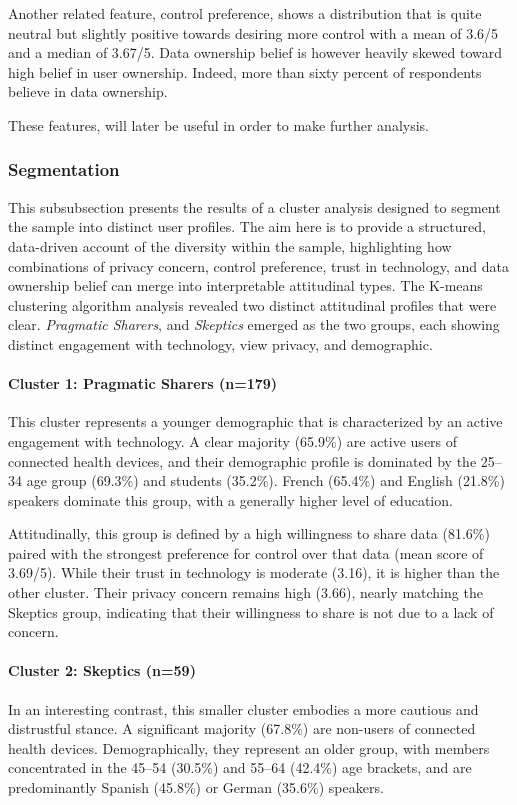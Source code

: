 	Another related feature, control preference, shows a distribution that is quite neutral but slightly positive towards desiring more control with a mean of 3.6/5 and a median of 3.67/5.
	Data ownership belief is however heavily skewed toward high belief in user ownership. Indeed, more than sixty percent of respondents believe in data ownership.     

	These features, will later be useful in order to make further analysis.
	\subsubsection{Segmentation}
This subsubsection presents the results of a cluster analysis designed to segment the sample into distinct user profiles. The aim here is to provide a structured, data-driven account of the diversity within the sample, highlighting how combinations of privacy concern, control preference, trust in technology, and data ownership belief can merge into interpretable attitudinal types.
The K-means clustering algorithm analysis revealed two distinct attitudinal profiles that were clear. \textit{Pragmatic Sharers}, and \textit{Skeptics} emerged as the two groups, each showing distinct engagement with technology, view privacy, and demographic.

\paragraph{Cluster 1: Pragmatic Sharers (n=179)} This cluster represents a younger demographic that is characterized by an active engagement with technology. A clear majority (65.9\%) are active users of connected health devices, and their demographic profile is dominated by the 25--34 age group (69.3\%) and students (35.2\%). French (65.4\%) and English (21.8\%) speakers dominate this group, with a generally higher level of education.

Attitudinally, this group is defined by a high willingness to share data (81.6\%) paired with the strongest preference for control over that data (mean score of 3.69/5). While their trust in technology is moderate (3.16), it is higher than the other cluster. Their privacy concern remains high (3.66), nearly matching the Skeptics group, indicating that their willingness to share is not due to a lack of concern.

\paragraph{Cluster 2: Skeptics (n=59)} In an interesting contrast, this smaller cluster embodies a more cautious and distrustful stance. A significant majority (67.8\%) are non-users of connected health devices. Demographically, they represent an older group, with members concentrated in the 45--54 (30.5\%) and 55--64 (42.4\%) age brackets, and are predominantly Spanish (45.8\%) or German (35.6\%) speakers.

